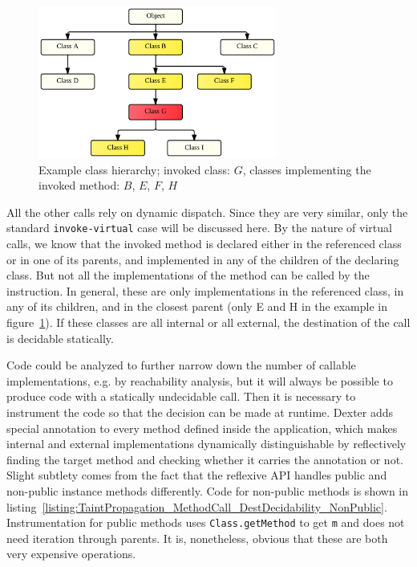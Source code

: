 \documentclass[12pt,twoside,notitlepage]{report}
\begin{document}
\begin{figure}
	\centerline{	
		\includegraphics[width=0.7\textwidth]{figs/fig_virtual_call_tree.png}
	}
	\caption{Example class hierarchy; invoked class: $G$, classes implementing the invoked method: $B$, $E$, $F$, $H$}
	\label{fig:TaintPropagation_DestDecision_ClassHierarchy}
\end{figure}

All the other calls rely on dynamic dispatch. Since they are very similar, only the standard \verb$invoke-virtual$ case will be discussed here. By the nature of virtual calls, we know that the invoked method is declared either in the referenced class or in one of its parents, and implemented in any of the children of the declaring class. But not all the implementations of the method can be called by the instruction. In general, these are only implementations in the referenced class, in any of its children, and in the closest parent (only E and H in the example in figure~\ref{fig:TaintPropagation_DestDecision_ClassHierarchy}). If these classes are all internal or all external, the destination of the call is decidable statically. 

Code could be analyzed to further narrow down the number of callable implementations, e.g. by reachability analysis, but it will always be possible to produce code with a statically undecidable call. Then it is necessary to instrument the code so that the decision can be made at runtime. Dexter adds special annotation to every method defined inside the application, which makes internal and external implementations dynamically distinguishable by reflectively finding the target method and checking whether it carries the annotation or not. Slight subtlety comes from the fact that the reflexive API handles public and non-public instance methods differently. Code for non-public methods is shown in listing~\ref{listing:TaintPropagation_MethodCall_DestDecidability_NonPublic}. Instrumentation for public methods uses \verb$Class.getMethod$ to get \verb$m$ and does not need iteration through parents. It is, nonetheless, obvious that these are both very expensive operations. 
\end{document}
